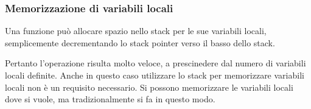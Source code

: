 \subsubsection{Memorizzazione di variabili locali}

Una funzione può allocare spazio nello stack per le sue variabili locali, semplicemente decrementando
lo \gls{stack pointer} verso il basso dello stack.


Pertanto l'operazione risulta molto veloce, a prescinedere dal numero di variabili locali definite.
Anche in questo caso utilizzare lo stack per memorizzare variabili locali non è un requisito necessario.
Si possono memorizzare le variabili locali dove si vuole,
ma tradizionalmente si fa in questo modo.
